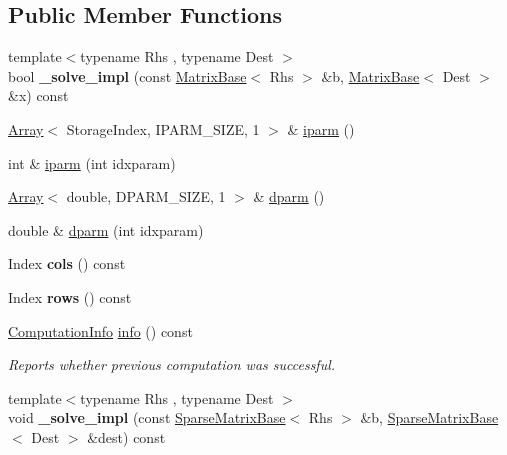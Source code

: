 \subsection*{Public Member Functions}
\begin{DoxyCompactItemize}
\item 
\mbox{\label{class_eigen_1_1_pastix_base_a63c39ad03354e57b4ea67683dead4674}} 
{\footnotesize template$<$typename Rhs , typename Dest $>$ }\\bool {\bfseries \+\_\+solve\+\_\+impl} (const \mbox{\hyperlink{class_eigen_1_1_matrix_base}{Matrix\+Base}}$<$ Rhs $>$ \&b, \mbox{\hyperlink{class_eigen_1_1_matrix_base}{Matrix\+Base}}$<$ Dest $>$ \&x) const
\item 
\mbox{\hyperlink{class_eigen_1_1_array}{Array}}$<$ Storage\+Index, I\+P\+A\+R\+M\+\_\+\+S\+I\+ZE, 1 $>$ \& \mbox{\hyperlink{class_eigen_1_1_pastix_base_a38378e7b2b5c750a8a23e2c21a69146c}{iparm}} ()
\item 
int \& \mbox{\hyperlink{class_eigen_1_1_pastix_base_a5509ca8d6a9217fb95ab020363b9e0fb}{iparm}} (int idxparam)
\item 
\mbox{\hyperlink{class_eigen_1_1_array}{Array}}$<$ double, D\+P\+A\+R\+M\+\_\+\+S\+I\+ZE, 1 $>$ \& \mbox{\hyperlink{class_eigen_1_1_pastix_base_af4a29373aa3e6a980738efde33f92a76}{dparm}} ()
\item 
double \& \mbox{\hyperlink{class_eigen_1_1_pastix_base_a6e7baecd4990d6df9b5713cb6499e940}{dparm}} (int idxparam)
\item 
\mbox{\label{class_eigen_1_1_pastix_base_a6ba5c02c8b13ad144a96f9fb6a5885e5}} 
Index {\bfseries cols} () const
\item 
\mbox{\label{class_eigen_1_1_pastix_base_a01b3786f9c460d32284fe63655f29109}} 
Index {\bfseries rows} () const
\item 
\mbox{\hyperlink{group__enums_ga85fad7b87587764e5cf6b513a9e0ee5e}{Computation\+Info}} \mbox{\hyperlink{class_eigen_1_1_pastix_base_a436e99a385c9c019be9627cc1fa884cf}{info}} () const
\begin{DoxyCompactList}\small\item\em Reports whether previous computation was successful. \end{DoxyCompactList}\item 
\mbox{\label{class_eigen_1_1_pastix_base_a886c757fea6fe1d992a66524213f14fb}} 
{\footnotesize template$<$typename Rhs , typename Dest $>$ }\\void {\bfseries \+\_\+solve\+\_\+impl} (const \mbox{\hyperlink{class_eigen_1_1_sparse_matrix_base}{Sparse\+Matrix\+Base}}$<$ Rhs $>$ \&b, \mbox{\hyperlink{class_eigen_1_1_sparse_matrix_base}{Sparse\+Matrix\+Base}}$<$ Dest $>$ \&dest) const
\end{DoxyCompactItemize}
